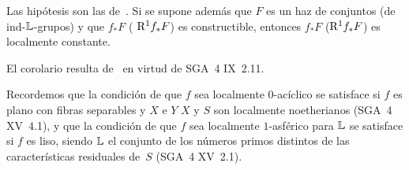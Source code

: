 
\begin{corollaire}
\label{XIII.1.16}
Las hipótesis son las de~. Si se supone además que $F$ es
un haz de conjuntos (\resp de ind-$\mathbb L$-grupos) y que $f_* F$ (\resp
$\mathrm{R}^1 f_* F$) es constructible, entonces $f_* F$ (\resp $\mathrm{R}^1 f_* F$)
es localmente constante.
\end{corollaire}

El corolario resulta de~ en virtud de SGA~4 IX~2.11.

\begin{remarque}
\label{XIII.1.17}
Recordemos que la condición de que $f$ sea localmente $0$-acíclico se
satisface si $f$ es plano con fibras separables y
{$X$ e $Y$}
{$X$ y $S$}
son localmente noetherianos (SGA~4 XV~4.1), y que la condición de que $f$ sea localmente
$1$-asférico
para $\mathbb L$ se satisface si $f$ es liso, siendo $\mathbb L$ el conjunto de los
números primos distintos de las características residuales de~$S$
(SGA~4 XV~2.1).
\end{remarque}
